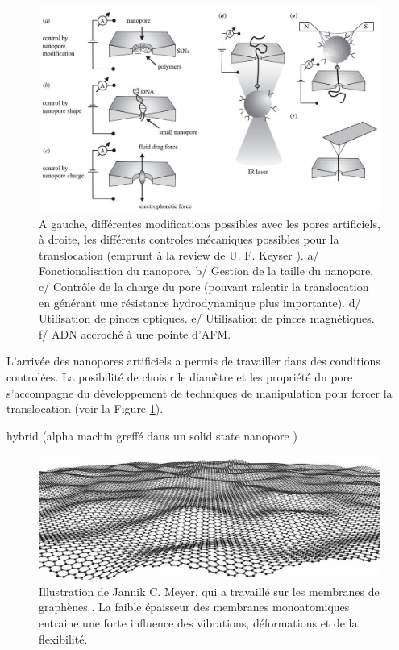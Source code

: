 \documentclass[a4paper,11pt]{article}
\begin{document}
\begin{figure}[h!]
\begin{center}
\includegraphics[width=1.0\textwidth]{solidstatenanopore.jpg}


\caption{A gauche, différentes modifications possibles avec les pores artificiels, à droite, les différents controles mécaniques possibles pour la translocation (emprunt à la review de U. F. Keyser \cite{keyser}). a/ Fonctionalisation du nanopore. b/ Gestion de la taille du nanopore. c/ Contrôle de la charge du pore (pouvant ralentir la translocation en générant une résistance hydrodynamique plus importante). d/ Utilisation de pinces optiques. e/ Utilisation de pinces magnétiques. f/ ADN accroché à une pointe d'AFM. }
\label{solidstateporepossib}
\end{center}
\end{figure}


L'arrivée des nanopores artificiels a permis de travailler dans des conditions controlées. La posibilité de choisir le diamètre et les propriété du pore s'accompagne du développement de techniques de manipulation pour forcer la translocation (voir la Figure \ref{solidstateporepossib}).




hybrid (alpha machin greffé dans un solid state nanopore \cite{Hall2010})


\begin{figure}[h!]
\begin{center}
\includegraphics[width=1.0\textwidth]{vib.jpg}


\caption{Illustration de Jannik C. Meyer, qui a travaillé sur les membranes de graphènes \cite{Meyer2007}. La faible épaisseur des membranes monoatomiques entraine une forte influence des vibrations, déformations et de la flexibilité.}
\label{membvib}
\end{center}
\end{figure}
\end{document}
